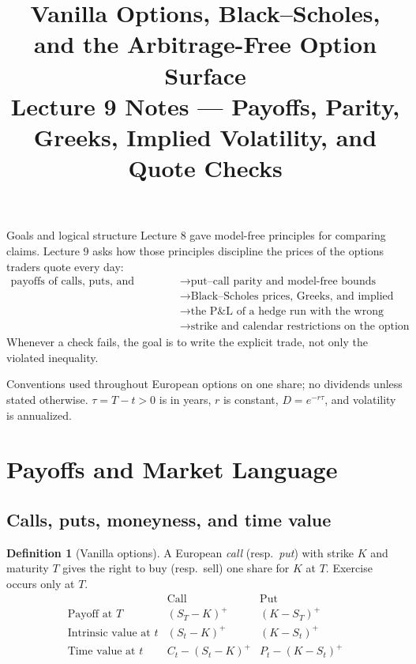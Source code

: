\documentclass[10pt]{article}
\title{\textbf{Vanilla Options, Black--Scholes, and the Arbitrage-Free Option Surface}\\
\large Lecture 9 Notes --- Payoffs, Parity, Greeks, Implied Volatility, and Quote Checks}
\author{}
\date{}
\newcommand{\1}{\mathbf 1}
\theoremstyle{definition}
\newtheorem{definition}{Definition}[section]
\begin{document}
\maketitle
\vspace{-1.4em}

\begin{keyidea}{Goals and logical structure}
Lecture 8 gave model-free principles for comparing claims. Lecture 9 asks how
those principles discipline the prices of the options traders quote every day:
\[
\begin{aligned}
\text{payoffs of calls, puts, and combinations}
&\longrightarrow \text{put--call parity and model-free bounds}\\
&\longrightarrow \text{Black--Scholes prices, Greeks, and implied volatility}\\
&\longrightarrow \text{the P\&L of a hedge run with the wrong volatility}\\
&\longrightarrow \text{strike and calendar restrictions on the option surface.}
\end{aligned}
\]
Whenever a check fails, the goal is to write the explicit trade, not only the
violated inequality.
\end{keyidea}

\begin{assumptionbox}{Conventions used throughout}
European options on one share; no dividends unless stated otherwise.
\(\tau=T-t>0\) is in years, \(r\) is constant, \(D=e^{-r\tau}\), and
volatility is annualized.
\end{assumptionbox}

\section{Payoffs and Market Language}

\subsection{Calls, puts, moneyness, and time value}

\begin{definition}[Vanilla options]
A European \emph{call} (resp.\ \emph{put}) with strike \(K\) and maturity
\(T\) gives the right to buy (resp.\ sell) one share for \(K\) at \(T\).
Exercise occurs only at \(T\).
\[
\begin{array}{c|cc}
 &\text{Call}&\text{Put}\\ \hline
\text{Payoff at }T &(S_T-K)^+&(K-S_T)^+\\
\text{Intrinsic value at }t &(S_t-K)^+&(K-S_t)^+\\
\text{Time value at }t &C_t-(S_t-K)^+&P_t-(K-S_t)^+
\end{array}
\]
\end{definition}
\end{document}
